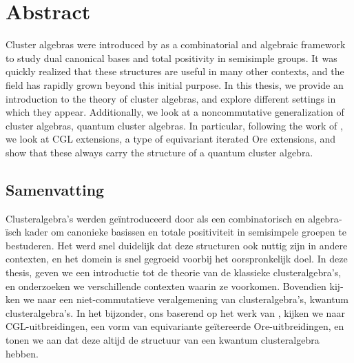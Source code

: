 \chapter*{Abstract}
Cluster algebras were introduced by \textcite{FominZelevinsky2002CAF} as a
combinatorial and algebraic framework to study dual canonical bases and total
positivity in semisimple groups. It was quickly realized that these structures are
useful in many other contexts, and the field has rapidly grown beyond this initial
purpose. In this thesis, we provide an introduction to the theory of cluster
algebras, and explore different settings in which they appear. Additionally, we look at
a noncommutative generalization of cluster algebras, quantum cluster
algebras. In particular, following the work of \textcite{GoodearlYakimov2017QCA}, we
look at CGL extensions, a type of equivariant iterated Ore extensions, and show that
these always carry the structure of a quantum cluster algebra.

\begin{otherlanguage}{dutch}

	\chapter*{Samenvatting}

	Clusteralgebra's werden geïntroduceerd door \textcite{FominZelevinsky2002CAF} als een
	combinatorisch en algebraïsch kader om canonieke basissen en totale positiviteit in
	semisimpele groepen te bestuderen. Het werd snel duidelijk dat deze structuren ook
	nuttig zijn in andere contexten, en het domein is snel gegroeid voorbij het
	oorspronkelijk doel. In deze thesis, geven we een introductie tot de theorie van de
	klassieke clusteralgebra's, en onderzoeken we verschillende contexten waarin ze
	voorkomen. Bovendien kijken we naar een niet-commutatieve veralgemening van
	clusteralgebra's, kwantum clusteralgebra's. In het bijzonder, ons baserend op het werk
	van \textcite{GoodearlYakimov2017QCA}, kijken we naar CGL-uitbreidingen, een vorm van
	equivariante geïtereerde Ore-uitbreidingen, en tonen we aan dat deze altijd de
	structuur van een kwantum clusteralgebra hebben.

\end{otherlanguage}
